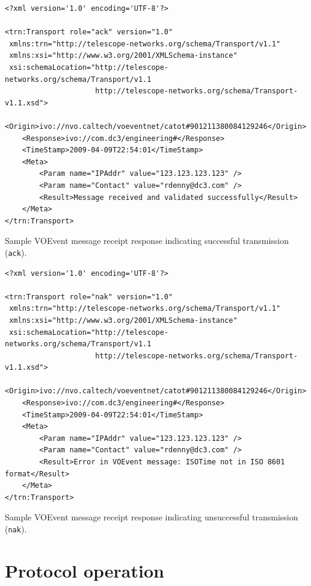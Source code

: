 \documentclass[a4paper,11pt]{ivoa}
\begin{document}
\begin{listing*}
\begin{verbatim}
<?xml version='1.0' encoding='UTF-8'?>

<trn:Transport role="ack" version="1.0"
 xmlns:trn="http://telescope-networks.org/schema/Transport/v1.1"
 xmlns:xsi="http://www.w3.org/2001/XMLSchema-instance"
 xsi:schemaLocation="http://telescope-networks.org/schema/Transport/v1.1
                     http://telescope-networks.org/schema/Transport-v1.1.xsd">
    <Origin>ivo://nvo.caltech/voeventnet/catot#901211380084129246</Origin>
    <Response>ivo://com.dc3/engineering#</Response>
    <TimeStamp>2009-04-09T22:54:01</TimeStamp>
    <Meta>
        <Param name="IPAddr" value="123.123.123.123" />
        <Param name="Contact" value="rdenny@dc3.com" />
        <Result>Message received and validated successfully</Result>
    </Meta>
</trn:Transport>
\end{verbatim}
\caption{Sample VOEvent message receipt response indicating successful
transmission (\texttt{ack}).}
\label{lst:ack}
\end{listing*}

\begin{listing*}
\begin{verbatim}
<?xml version='1.0' encoding='UTF-8'?>

<trn:Transport role="nak" version="1.0"
 xmlns:trn="http://telescope-networks.org/schema/Transport/v1.1"
 xmlns:xsi="http://www.w3.org/2001/XMLSchema-instance"
 xsi:schemaLocation="http://telescope-networks.org/schema/Transport/v1.1
                     http://telescope-networks.org/schema/Transport-v1.1.xsd">
    <Origin>ivo://nvo.caltech/voeventnet/catot#901211380084129246</Origin>
    <Response>ivo://com.dc3/engineering#</Response>
    <TimeStamp>2009-04-09T22:54:01</TimeStamp>
    <Meta>
        <Param name="IPAddr" value="123.123.123.123" />
        <Param name="Contact" value="rdenny@dc3.com" />
        <Result>Error in VOEvent message: ISOTime not in ISO 8601 format</Result>
    </Meta>
</trn:Transport>
\end{verbatim}
\caption{Sample VOEvent message receipt response indicating unsuccessful
transmission (\texttt{nak}).}
\label{lst:nak}
\end{listing*}

\section{Protocol operation}
\end{document}
